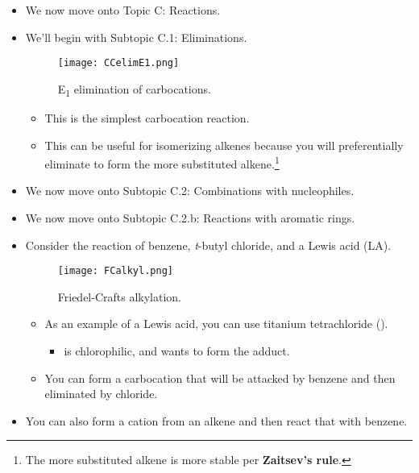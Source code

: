 \documentclass[../notes.tex]{subfiles}
\begin{document}
\begin{itemize}
\begin{itemize}
    \end{itemize}
    \item We now move onto Topic C: Reactions.
    \item We'll begin with Subtopic C.1: Eliminations.
    \begin{figure}[h!]
        \centering
        \texttt{[image: CCelimE1.png]}
        \caption{E\textsubscript{1} elimination of carbocations.}
        \label{fig:CCelimE1}
    \end{figure}
    \begin{itemize}
        \item This is the simplest carbocation reaction.
        \item This can be useful for isomerizing alkenes because you will preferentially eliminate to form the more substituted alkene.\footnote{The more substituted alkene is more stable per \textbf{Zaitsev's rule}.}
    \end{itemize}
    \item We now move onto Subtopic C.2: Combinations with nucleophiles.
    \item We now move onto Subtopic C.2.b{}: Reactions with aromatic rings.
    \item Consider the reaction of benzene, \emph{t}-butyl chloride, and a Lewis acid (LA).
    \begin{figure}[h!]
        \centering
        \texttt{[image: FCalkyl.png]}
        \caption{Friedel-Crafts alkylation.}
        \label{fig:FCalkyl}
    \end{figure}
    \begin{itemize}
        \item As an example of a Lewis acid, you can use titanium tetrachloride ().
        \begin{itemize}
            \item {} is chlorophilic, and wants to form the  adduct.
        \end{itemize}
        \item You can form a carbocation that will be attacked by benzene and then eliminated by chloride.
    \end{itemize}
    \item You can also form a cation from an alkene and then react that with benzene.
    \begin{figure}[H]
        \centering

\end{figure}
\end{itemize}
\end{document}
